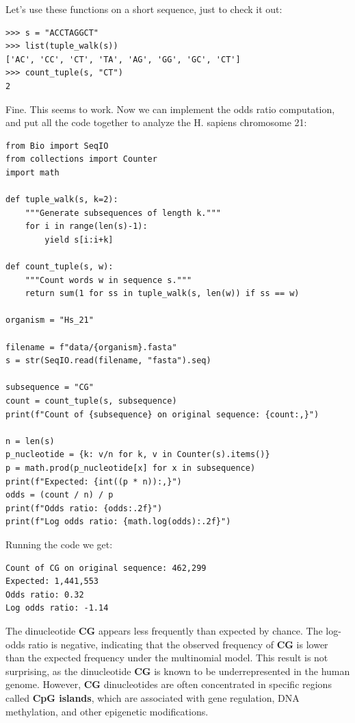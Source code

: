 Let's use these functions on a short sequence, just to check it out:

\vspace*{3mm}
\begin{lstlisting}
>>> s = "ACCTAGGCT"
>>> list(tuple_walk(s))
['AC', 'CC', 'CT', 'TA', 'AG', 'GG', 'GC', 'CT']
>>> count_tuple(s, "CT")
2
\end{lstlisting}

Fine. This seems to work. Now we can implement the odds ratio computation, and put all the code together to analyze the H. sapiens chromosome 21:

\vspace*{3mm}
\begin{lstlisting}
from Bio import SeqIO
from collections import Counter
import math

def tuple_walk(s, k=2):
    """Generate subsequences of length k."""
    for i in range(len(s)-1):
        yield s[i:i+k]

def count_tuple(s, w):
    """Count words w in sequence s."""
    return sum(1 for ss in tuple_walk(s, len(w)) if ss == w)

organism = "Hs_21"

filename = f"data/{organism}.fasta"
s = str(SeqIO.read(filename, "fasta").seq)

subsequence = "CG"
count = count_tuple(s, subsequence)
print(f"Count of {subsequence} on original sequence: {count:,}")

n = len(s)
p_nucleotide = {k: v/n for k, v in Counter(s).items()}
p = math.prod(p_nucleotide[x] for x in subsequence)
print(f"Expected: {int((p * n)):,}")
odds = (count / n) / p
print(f"Odds ratio: {odds:.2f}")
print(f"Log odds ratio: {math.log(odds):.2f}")
\end{lstlisting}

Running the code we get:

\vspace*{3mm}
\begin{lstlisting}
Count of CG on original sequence: 462,299
Expected: 1,441,553
Odds ratio: 0.32
Log odds ratio: -1.14
\end{lstlisting}

The dinucleotide \textbf{CG} appears less frequently than expected by chance. The log-odds ratio is negative, indicating that the observed frequency of \textbf{CG} is lower than the expected frequency under the multinomial model. This result is not surprising, as the dinucleotide \textbf{CG} is known to be underrepresented in the human genome. However, \textbf{CG} dinucleotides are often concentrated in specific regions called \textbf{CpG islands}, which are associated with gene regulation, DNA methylation, and other epigenetic modifications.

